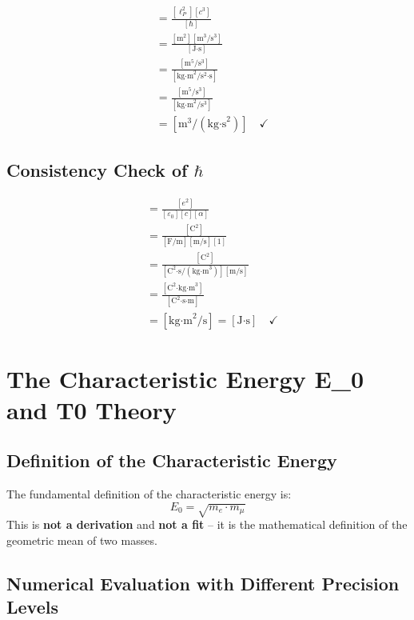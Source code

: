 \documentclass[12pt,a4paper]{article}
\theoremstyle{definition}
\begin{document}
	\begin{align}
		[G] &= \frac{[\ell_P^2][c^3]}{[\hbar]}\\
		&= \frac{[\text{m}^2][\text{m}^3/\text{s}^3]}{[\text{J·s}]}\\
		&= \frac{[\text{m}^5/\text{s}^3]}{[\text{kg·m}^2/\text{s}^2\text{·s}]}\\
		&= \frac{[\text{m}^5/\text{s}^3]}{[\text{kg·m}^2/\text{s}^3]}\\
		&= [\text{m}^3/(\text{kg·s}^2)] \quad \checkmark
	\end{align}
	
	\subsection{Consistency Check of $\hbar$}
	
	\begin{align}
		[\hbar] &= \frac{[e^2]}{[\varepsilon_0][c][\alpha]}\\
		&= \frac{[\text{C}^2]}{[\text{F/m}][\text{m/s}][1]}\\
		&= \frac{[\text{C}^2]}{[\text{C}^2\text{·s}/(\text{kg·m}^3)][\text{m/s}]}\\
		&= \frac{[\text{C}^2\text{·kg·m}^3]}{[\text{C}^2\text{·s·m}]}\\
		&= [\text{kg·m}^2/\text{s}] = [\text{J·s}] \quad \checkmark
	\end{align}
	
	\section{The Characteristic Energy E\_0 and T0 Theory}
	
	\subsection{Definition of the Characteristic Energy}
	
	\begin{tcolorbox}[colback=blue!5!white,colframe=blue!75!black,title=Basic Definition]
		The fundamental definition of the characteristic energy is:
		\begin{equation}
			\boxed{E_0 = \sqrt{m_e \cdot m_\mu}}
		\end{equation}
		This is \textbf{not a derivation} and \textbf{not a fit} -- it is the mathematical definition of the geometric mean of two masses.
	\end{tcolorbox}
	
	\subsection{Numerical Evaluation with Different Precision Levels}
	
\end{document}
